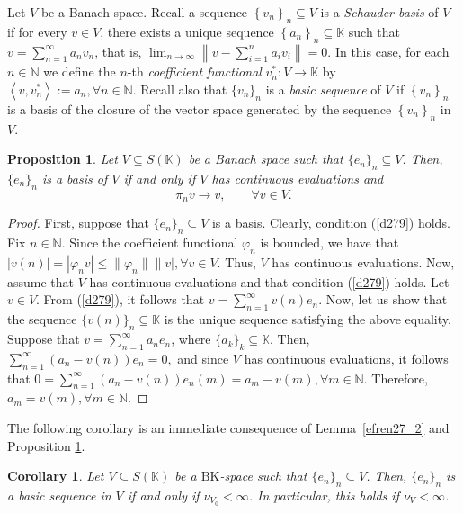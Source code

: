 \documentclass[14pt, a4paper]{article}  %
\providecommand{\llave}[1]{\left\lbrace #1\right\rbrace }
\providecommand{\norm}[1]{\left\lVert#1\right\rVert}
\newcommand{\var}{\varphi}
\newcommand{\tien}{\rightarrow}
\newcommand{\K}{\mathbb{K}}
\newcommand{\N}{\mathbb{N}}
\newcommand{\BK}{\text{BK}}
\newcommand{\la}{\left\langle}
\newcommand{\ra}{\right\rangle}
\newtheorem{corollary}{Corollary}[section]
\newtheorem{proposition}{Proposition}[section]
\begin{document}
		Let $V$ be a Banach space. Recall  a sequence $\llave{v_{n}}_{n}\subseteq V$ is a \emph{Schauder basis} of $V$ if for every $v\in V$, there exists a unique sequence $\llave{a_{n}}_{n}\subseteq \K$ such that $v=\sum_{n=1}^{\infty}a_{n}v_{n}$, that is, $\lim_{n\tien \infty}\norm{v-\sum_{i=1}^{n}a_{i}v_{i}}=0.$ In this case,
	for each $n\in \N$ we define the $n$-th \emph{coefficient functional} $v_{n}^{*}:V\tien \K$ by $\la v,v_{n}^{*}\ra:=a_{n}, \forall n\in \N.$ Recall also that  $\{v_{n}\}_{n}$ is a \emph{basic sequence} of $V$ if $\llave{v_{n}}_{n}$ is a basis of the closure of the vector space generated by the sequence $\llave{v_{n}}_{n}$  in $V$. 
	
	\begin{proposition}\label{d286_0}
		Let $V \subseteq S(\K)$ be a Banach space such that $\{e_{n}\}_{n} \subseteq V$. Then, $\{e_{n}\}_{n}$ is a basis of $V$ if and only if $V$ has continuous evaluations and
		\begin{equation}\label{d279}
			\pi_{n}v \tien v, \qquad \forall v \in V.
		\end{equation}
	\end{proposition}
	
	\begin{proof}
		First, suppose that $\{e_{n}\}_{n} \subseteq V$ is a basis. Clearly, condition (\ref{d279}) holds. Fix $n \in \N$. Since the coefficient functional $\var_{n}$ is bounded, we have that $	|v(n)| = |\var_{n}v| \leq \|\var_{n}\|\|v|,   \forall v \in V.$
		Thus, $V$ has continuous evaluations. Now, assume that $V$ has continuous evaluations and that condition (\ref{d279}) holds. Let $v \in V$. From (\ref{d279}), it follows that $v = \sum_{n=1}^{\infty} v(n) e_{n}$. Now, let us show that the sequence $\{v(n)\}_{n} \subseteq \K$ is the unique sequence satisfying the above equality. Suppose that $v = \sum_{n=1}^{\infty} a_{n} e_{n}$, where $\{a_{k}\}_{k} \subseteq \K$. Then, $\sum_{n=1}^{\infty} (a_{n} - v(n)) e_{n} = 0,$
		and since $V$ has continuous evaluations, it follows that
		$
		0 = \sum_{n=1}^{\infty} (a_{n} - v(n)) e_{n}(m) = a_{m} - v(m),   \forall m \in \N.
		$
		Therefore, $a_{m} = v(m),  \forall m \in \N$.
	\end{proof} 
	
		The following corollary is an immediate consequence of Lemma~\ref{efren27_2} and Proposition \ref{d286_0}.
	
	\begin{corollary}\label{lola199_0} \label{lola209_0}
		Let $V \subseteq S(\K)$ be a $\BK$-space such that $\{e_{n}\}_{n} \subseteq V$. Then, $\{e_{n}\}_{n}$ is a basic sequence in $V$ if and only if $\nu_{V_{0}} < \infty$. In particular, this holds if $\nu_{V} < \infty$.
	\end{corollary}
	
\end{document}
